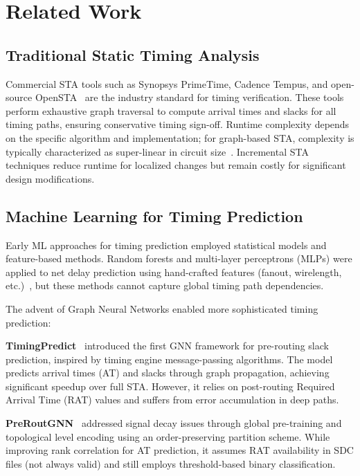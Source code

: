 \documentclass[10pt,twocolumn,journal]{IEEEtran}
\begin{document}
\section{Related Work}
\label{sec:related}

\subsection{Traditional Static Timing Analysis}

Commercial STA tools such as Synopsys PrimeTime, Cadence Tempus, and open-source OpenSTA~\cite{opensta} are the industry standard for timing verification. These tools perform exhaustive graph traversal to compute arrival times and slacks for all timing paths, ensuring conservative timing sign-off. Runtime complexity depends on the specific algorithm and implementation; for graph-based STA, complexity is typically characterized as super-linear in circuit size~\cite{opensta}. Incremental STA techniques reduce runtime for localized changes but remain costly for significant design modifications.

\subsection{Machine Learning for Timing Prediction}

Early ML approaches for timing prediction employed statistical models and feature-based methods. Random forests and multi-layer perceptrons (MLPs) were applied to net delay prediction using hand-crafted features (fanout, wirelength, etc.)~\cite{kirby2019congestionnet}, but these methods cannot capture global timing path dependencies.

The advent of Graph Neural Networks enabled more sophisticated timing prediction:

\textbf{TimingPredict}~\cite{guo2022timingpredict} introduced the first GNN framework for pre-routing slack prediction, inspired by timing engine message-passing algorithms. The model predicts arrival times (AT) and slacks through graph propagation, achieving significant speedup over full STA. However, it relies on post-routing Required Arrival Time (RAT) values and suffers from error accumulation in deep paths.

\textbf{PreRoutGNN}~\cite{zhong2024preroutgnn} addressed signal decay issues through global pre-training and topological level encoding using an order-preserving partition scheme. While improving rank correlation for AT prediction, it assumes RAT availability in SDC files (not always valid) and still employs threshold-based binary classification.
\end{document}
